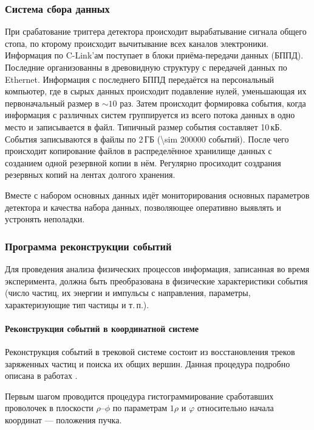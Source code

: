 \subsubsection{Система сбора данных}
\label{sec:daq}

При срабатование триггера детектора происходит вырабатывание сигнала общего стопа,
по кторому происходит вычитывание всех каналов электроники.
Информация по C-Link'ам поступает в блоки приёма-передачи данных (БППД).
Последние организованны в древовидную структуру с передачей данных по Ethernet.
Информация с последнего БППД передаётся на персональный компьютер,
где в сырых данных происходит подавление нулей,
уменьшающая их первоначальный размер в $\sim 10$ раз.
Затем происходит формировка события,
когда информация с различных систем группируется из всего потока данных в одно место и записывается в файл.
Типичный размер события составляет 10\,кБ.
События записываются в файлы по 2\,ГБ (\num{\sim 200000} событий).
После чего происходит копирование файлов в распределённое хранилище данных с созданием одной резервной копии в нём.
Регулярно просиходит создрания резервных копий на лентах долгого хранения.

Вместе с набором основных данных идёт мониторирования основных параметров детектора и качества набора данных,
позволяющее оперативно выявлять и устронять неполадки.




\subsubsection{Программа реконструкции событий}
\label{sec:event_reco}


Для проведения анализа физических процессов информация,
записанная во время эксперимента,
должна быть преобразована в физические характеристики события
(число частиц,
их энергии и импульсы с направления,
параметры,
характеризующие тип частицы и т.\,п.).


\paragraph{Реконструкция событий в координатной системе}

Реконструкция событий в трековой системе состоит из восстановления треков заряженных частиц и поиска их общих вершин.
Данная процедура подробно описана в работах \cite{Karawdina:2007:track_reco}.


Первым шагом проводится процедура гистограммирование сработавших проволочек
в плоскости $\rho$--$\phi$ по параметрам $1\rho$ и $\varphi$ относительно начала координат
--- положения пучка.

